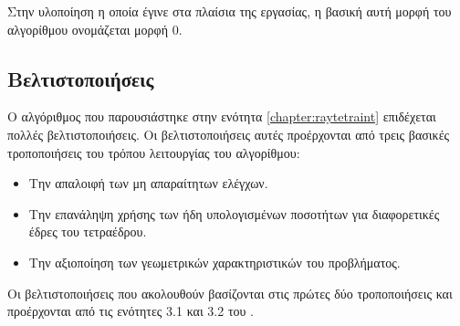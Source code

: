 Στην υλοποίηση η οποία έγινε στα πλαίσια της εργασίας, η βασική αυτή μορφή του αλγορίθμου ονομάζεται μορφή 0.  

\subsection{Βελτιστοποιήσεις}

\noindent Ο αλγόριθμος που παρουσιάστηκε στην ενότητα \ref{chapter:raytetraint} επιδέχεται πολλές βελτιστοποιήσεις. Οι βελτιστοποιήσεις αυτές προέρχονται από τρεις βασικές τροποποιήσεις του τρόπου λειτουργίας του αλγορίθμου:

\begin{itemize}
\item Την απαλοιφή των μη απαραίτητων ελέγχων.
\item Την επανάληψη χρήσης των ήδη υπολογισμένων ποσοτήτων για διαφορετικές έδρες του τετραέδρου.
\item Την αξιοποίηση των γεωμετρικών χαρακτηριστικών του προβλήματος.  
\end{itemize}

Οι βελτιστοποιήσεις που ακολουθούν βασίζονται στις πρώτες δύο τροποποιήσεις και προέρχονται από τις ενότητες 3.1 και 3.2 του \cite{PlatisTheoharis03}.

